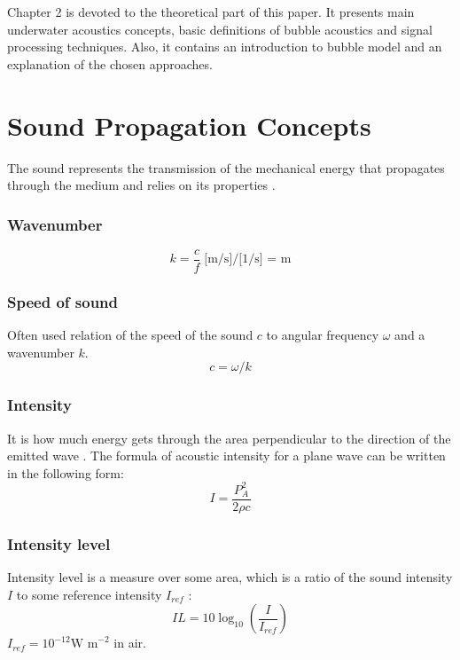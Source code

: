 Chapter 2 is devoted to the theoretical part of this paper. It presents main underwater acoustics concepts, basic definitions of bubble acoustics and signal processing techniques. Also, it contains an introduction to bubble model and an explanation of the chosen approaches.

\section{Sound Propagation Concepts}
The sound represents the transmission of the mechanical energy that  propagates through the medium and relies on its properties \cite[p.1]{leighton_acoustic_2012}.
\subsubsection*{Wavenumber}
\begin{equation}
    k = \frac{c}{f} \; \text{[m/s]/[1/s] = m}
\end{equation}
\subsubsection*{Speed of sound}
    Often used relation of the speed of the sound $c$ to angular frequency $\omega$ and a wavenumber $k$. 
    \[c = \omega / k\]
\subsubsection*{Intensity} 
It is how much energy gets through the area perpendicular to the direction of the emitted wave \cite[p.18]{leighton_acoustic_2012}. The formula of acoustic intensity for a plane wave can be written in the following form:%
\[I = \frac{P_A^2}{2\rho c}\]
\subsubsection*{Intensity level}
Intensity level is a measure over some area, which is a ratio of the sound intensity $I$ to some reference intensity $I_{ref}$ \cite[p.19]{leighton_acoustic_2012}:
\[IL = 10\log_{10}(\frac{I}{I_{ref}})\]
$I_{ref}=10^{-12} \text{W m}^{-2}$ in air.

